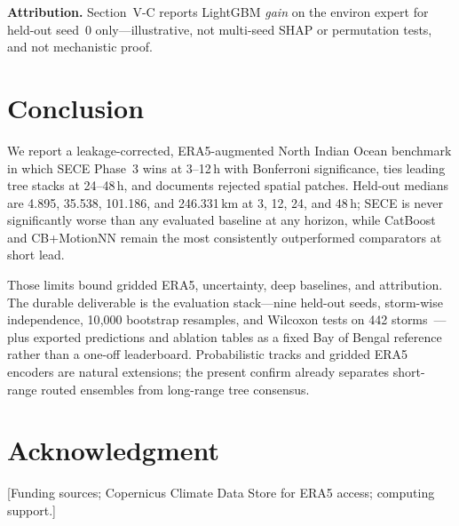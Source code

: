 \documentclass[conference]{IEEEtran}
\newcommand{\sece}{SECE}
\newcommand{\bob}{Bay of Bengal}
\newcommand{\era}{ERA5}
\begin{document}
\textbf{Attribution.} Section~V-C reports LightGBM \emph{gain} on the environ
expert for held-out seed~0 only---illustrative, not multi-seed SHAP or permutation
tests, and not mechanistic proof.

\section{Conclusion}
We report a leakage-corrected, \era{}-augmented North Indian Ocean benchmark in
which \sece{} Phase~3 wins at 3--12\,h with Bonferroni significance, ties leading
tree stacks at 24--48\,h, and documents rejected spatial patches. Held-out medians
are 4.895, 35.538, 101.186, and 246.331\,km at 3, 12, 24, and 48\,h; \sece{} is
never significantly worse than any evaluated baseline at any horizon, while
CatBoost and CB+MotionNN remain the most consistently outperformed comparators at
short lead.

Those limits bound gridded \era{}, uncertainty, deep baselines, and attribution.
The durable deliverable is the evaluation stack---nine held-out seeds, storm-wise
independence, 10{,}000 bootstrap resamples, and Wilcoxon tests on 442
storms~\cite{efron1979,wilcoxon1945}---plus exported predictions and ablation
tables as a fixed \bob{} reference rather than a one-off leaderboard. Probabilistic
tracks and gridded \era{} encoders are natural extensions; the present confirm
already separates short-range routed ensembles from long-range tree consensus.

\section*{Acknowledgment}
[Funding sources; Copernicus Climate Data Store for \era{} access; computing support.]
\end{document}
